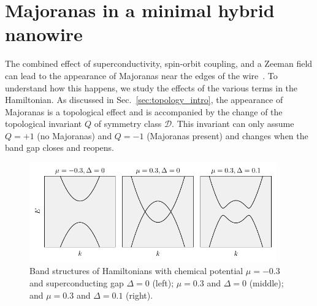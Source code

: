 

\section{Majoranas in a minimal hybrid nanowire}\label{sec:minimal_majoranas}
The combined effect of superconductivity, spin-orbit coupling, and a Zeeman field can lead to the appearance of Majoranas near the edges of the wire~\cite{Lutchyn2010,Oreg2010}.
To understand how this happens, we study the effects of the various terms in the Hamiltonian.
As discussed in Sec.~\ref{sec:topology_intro}, the appearance of Majoranas is a topological effect and is accompanied by the change of the topological invariant $Q$ of symmetry class $\mathcal{D}$.
This invariant can only assume $Q=+1$ (no Majoranas) and $Q=-1$ (Majoranas present) and changes when the band gap closes and reopens.

\begin{figure}
\begin{center}
\includegraphics[width=0.95\textwidth]{chapter_introduction/figures/triv_topo_bandstructure.pdf}
\caption{Band structures of Hamiltonians with chemical potential $\mu=-0.3$ and superconducting gap $\Delta=0$ (left); $\mu=0.3$ and $\Delta=0$ (middle); and $\mu=0.3$ and $\Delta=0.1$ (right).
\label{fig:triv_topo_bandstructure}}
\end{center}
\end{figure}

